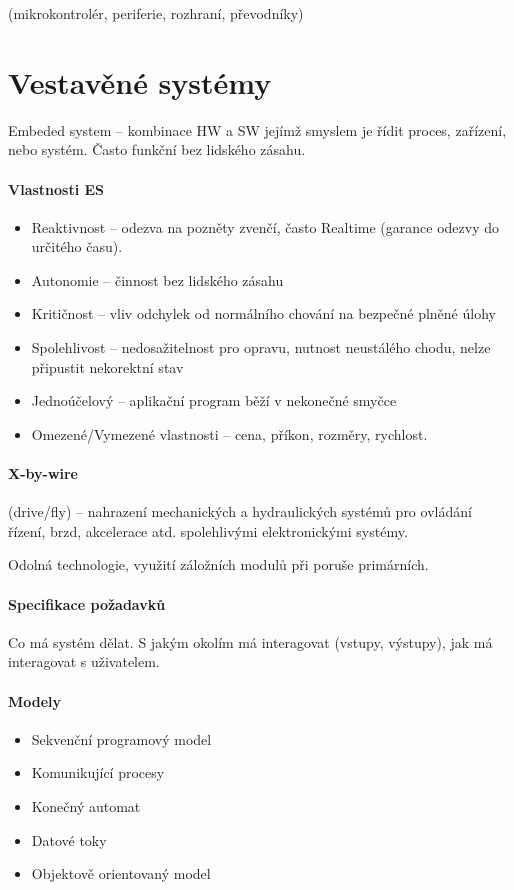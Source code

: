 \documentclass[a4paper, 11pt]{report}
\begin{document}
(mikrokontrolér, periferie, rozhraní, převodníky)

\section{Vestavěné systémy}
Embeded system -- kombinace HW a SW jejímž smyslem je řídit proces, zařízení, nebo systém. Často funkční bez lidského zásahu.

\paragraph{Vlastnosti ES}
\begin{itemize}
	\item Reaktivnost -- odezva na pozněty zvenčí, často Realtime (garance odezvy do určitého času).
	\item Autonomie -- činnost bez lidského zásahu
	\item Kritičnost -- vliv odchylek od normálního chování na bezpečné plněné úlohy
	\item Spolehlivost -- nedosažitelnost pro opravu, nutnost neustálého chodu, nelze připustit nekorektní stav
	\item Jednoúčelový -- aplikační program běží v nekonečné smyčce
	\item Omezené/Vymezené vlastnosti -- cena, příkon, rozměry, rychlost.
\end{itemize}

\paragraph{X-by-wire} (drive/fly) -- nahrazení mechanických a hydraulických systémů pro ovládání řízení, brzd, akcelerace atd. spolehlivými elektronickými systémy.

Odolná technologie, využití záložních modulů při poruše primárních.

\paragraph{Specifikace požadavků}
Co má systém dělat. S jakým okolím má interagovat (vstupy, výstupy), jak má interagovat s uživatelem.

\paragraph{Modely}
\begin{itemize}
	\item Sekvenční programový model
	\item Komunikující procesy
	\item Konečný automat
	\item Datové toky
	\item Objektově orientovaný model
\end{itemize}
\end{document}
